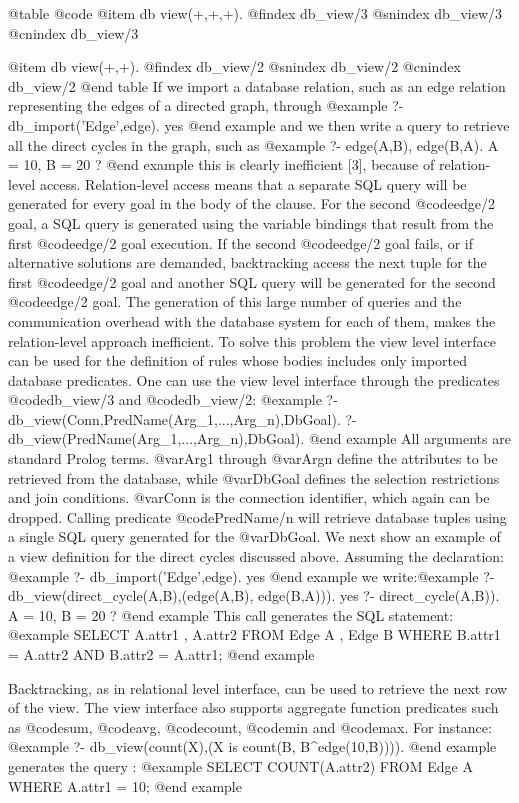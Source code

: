 {{{{{{{{{@table @code
@item db view(+,+,+).
@findex db_view/3
@snindex db_view/3
@cnindex db_view/3

@item db view(+,+).
@findex db_view/2
@snindex db_view/2
@cnindex db_view/2
@end table
If we import a database relation, such as an edge relation representing the edges of a directed graph, through
@example
?- db_import('Edge',edge). 
yes
@end example
and we then write a query to retrieve all the direct cycles in the
graph, such as
@example
?- edge(A,B), edge(B,A). 
A = 10, 
B = 20 ?
@end example
this is clearly inefficient [3], because of relation-level
access. Relation-level access means that a separate SQL query will be
generated for every goal in the body of the clause. For the second
@code{edge/2} goal, a SQL query is generated using the variable bindings that
result from the first @code{edge/2} goal execution. If the second
@code{edge/2} goal
fails, or if alternative solutions are demanded, backtracking access the
next tuple for the first @code{edge/2} goal and another SQL query will be
generated for the second @code{edge/2} goal. The generation of this large
number of queries and the communication overhead with the database
system for each of them, makes the relation-level approach inefficient.
To solve this problem the view level interface can be used for the
definition of rules whose bodies includes only imported database
predicates.  One can use the view level interface through the predicates
@code{db_view/3} and @code{db_view/2}:
@example
?- db_view(Conn,PredName(Arg_1,...,Arg_n),DbGoal).  
?- db_view(PredName(Arg_1,...,Arg_n),DbGoal).
@end example
 All arguments are standard Prolog terms. @var{Arg1} through @var{Argn}
define the attributes to be retrieved from the database, while
@var{DbGoal} defines the selection restrictions and join
conditions. @var{Conn} is the connection identifier, which again can be
dropped. Calling predicate @code{PredName/n} will retrieve database
tuples using a single SQL query generated for the @var{DbGoal}.  We next show
an example of a view definition for the direct cycles discussed
above. Assuming the declaration: 
@example
?- db_import('Edge',edge). 
yes
@end example
we
write:@example
?- db_view(direct_cycle(A,B),(edge(A,B), edge(B,A))). 
yes 
?- direct_cycle(A,B)). 
A = 10, 
B = 20 ?  
@end example
This call generates the SQL
statement: @example
SELECT A.attr1 , A.attr2
FROM Edge A , Edge B 
WHERE B.attr1 = A.attr2 AND B.attr2 = A.attr1;
@end example

Backtracking, as in relational level interface, can be used to retrieve the next row of the view.
The view interface also supports aggregate function predicates such as
@code{sum}, @code{avg}, @code{count}, @code{min} and @code{max}. For
instance:
@example
?- db_view(count(X),(X is count(B, B^edge(10,B)))).
@end example
generates the query :
@example
SELECT COUNT(A.attr2) 
FROM Edge A WHERE A.attr1 = 10;
@end example

}}}}}}}}}
